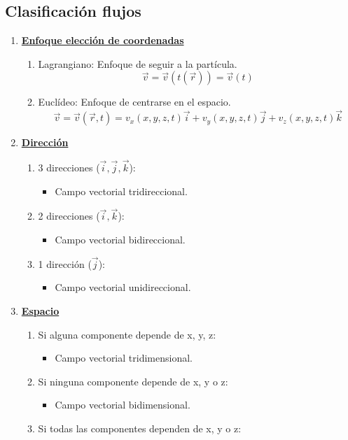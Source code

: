 \subsection{Clasificación flujos}
\begin{enumerate}
	\item \underline{\textbf{Enfoque elección de coordenadas}}
	\begin{enumerate}
		\item Lagrangiano: Enfoque de seguir a la partícula. 
		\[\vec{v}=\vec{v}(t(\vec{r}))=\vec{v}(t)\]
		\item Euclídeo: Enfoque de centrarse en el espacio.
		\[\vec{v}=\vec{v}(\vec{r},t)=v_x(x,y,z,t)\vec{i}+v_y(x,y,z,t)\vec{j}+v_z(x,y,z,t)\vec{k}\]
	\end{enumerate}
	\item \underline{\textbf{Dirección}}
	\begin{enumerate}
		\item 3 direcciones ($\vec{i},\vec{j},\vec{k}$): 
		\begin{itemize}
			\item Campo vectorial tridireccional.
		\end{itemize}
		\item 2 direcciones ($\vec{i},\vec{k}$):
		\begin{itemize}
			\item Campo vectorial bidireccional.
		\end{itemize}
		\item 1 dirección ($\vec{j}$):
		\begin{itemize}
			\item Campo vectorial unidireccional.
		\end{itemize}
	\end{enumerate}
	\item \underline{\textbf{Espacio}}
	\begin{enumerate}
		\item Si alguna componente depende de x, y, z: 
		\begin{itemize}
			\item Campo vectorial tridimensional.
		\end{itemize}
		\item Si ninguna componente depende de x, y o z: 
		\begin{itemize}
			\item Campo vectorial bidimensional.
		\end{itemize}
		\item Si todas las componentes dependen de x, y o z: 

\end{enumerate}
\end{enumerate}
